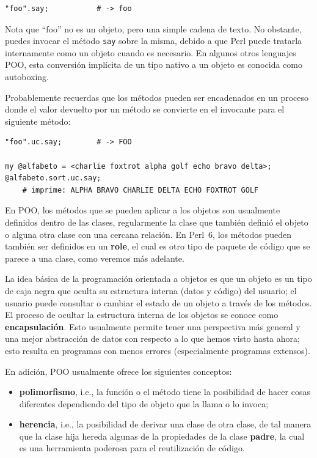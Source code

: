 \begin{lstlisting}
"foo".say;           # -> foo
\end{lstlisting}

Nota que ``foo'' no es un objeto, pero una simple cadena de texto.
No obstante, puedes invocar el método \verb|say| sobre la misma,
debido a que Perl puede tratarla internamente como un objeto cuando
es necesario. En algunos otros lenguajes POO, esta conversión implícita
de un tipo nativo a un objeto es conocida como autoboxing.

Probablemente recuerdas que los métodos pueden ser encadenados
en un proceso donde el valor devuelto por un método se convierte
en el invocante para el siguiente método:

\begin{lstlisting}
"foo".uc.say;        # -> FOO

my @alfabeto = <charlie foxtrot alpha golf echo bravo delta>;
@alfabeto.sort.uc.say;
    # imprime: ALPHA BRAVO CHARLIE DELTA ECHO FOXTROT GOLF 
\end{lstlisting}

En POO, los métodos que se pueden aplicar a los objetos son
usualmente definidos dentro de las clases, regularmente
la clase que también definió el objeto o alguna otra clase 
con una cercana relación. En Perl~6, los métodos pueden también
ser definidos en un {\bf role}, el cual es otro tipo de 
paquete de código que se parece a una clase, como veremos
más adelante.

La idea básica de la programación orientada a objetos es
que un objeto es un tipo de caja negra que oculta su
estructura interna (datos y código) del usuario; el usuario
puede consultar o cambiar el estado de un objeto a través de
los métodos. El proceso de ocultar la estructura interna
de los objetos se conoce como {\bf encapsulación}. Esto usualmente
permite tener una perspectiva más general y una mejor abstracción
de datos con respecto a lo que hemos visto hasta ahora;
esto resulta en programas con menos errores (especialmente programas
extensos).

En adición, POO usualmente ofrece los siguientes conceptos:
\begin{itemize}
\item {\bf polimorfismo}, i.e., la función o el método tiene la
posibilidad de hacer cosas diferentes dependiendo del tipo de 
objeto que la llama o lo invoca;
\item {\bf herencia}, i.e., la posibilidad de derivar una clase de
otra clase, de tal manera que la clase hija hereda algunas de la 
propiedades de la clase {\bf padre}, la cual es una herramienta
poderosa para el reutilización de código.
\end{itemize}

